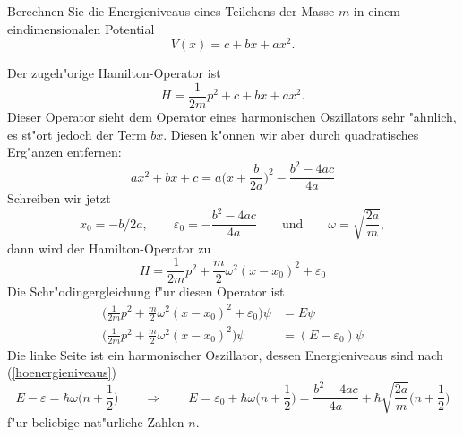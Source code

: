 Berechnen Sie die Energieniveaus eines Teilchens der Masse $m$ in einem
eindimensionalen Potential
\[
V(x)=c+bx+ax^2.
\]

\begin{loesung}
Der zugeh"orige Hamilton-Operator ist
\[
H=\frac1{2m}p^2 + c+bx+ax^2.
\]
Dieser Operator sieht dem Operator eines harmonischen Oszillators sehr
"ahnlich, es st"ort jedoch der Term $bx$.
Diesen k"onnen wir aber durch quadratisches Erg"anzen entfernen:
\[
ax^2+bx+c
=
a\biggl(x+\frac{b}{2a}\biggr)^2-\frac{b^2-4ac}{4a}
\]
Schreiben wir jetzt
\[
x_0=-b/2a,\qquad
\varepsilon_0=-\frac{b^2-4ac}{4a}
\qquad\text{und}\qquad
\omega=\sqrt{\frac{2a}{m}},
\]
dann wird der Hamilton-Operator zu
\[
H=\frac1{2m}p^2 +
\frac{m}{2}\omega^2(x-x_0)^2
+\varepsilon_0
\]
Die Schr"odingergleichung f"ur diesen Operator ist
\begin{align*}
\biggl(
\frac1{2m}p^2 +
\frac{m}{2}\omega^2(x-x_0)^2
+\varepsilon_0
\biggr)\psi&=E\psi
\\
\biggl(
\frac1{2m}p^2 +
\frac{m}{2}\omega^2(x-x_0)^2
\biggr)\psi&=(E-\varepsilon_0)\psi
\end{align*}
Die linke Seite ist ein harmonischer Oszillator, dessen Energieniveaus
sind nach (\ref{hoenergieniveaus})
\[
E-\varepsilon=\hbar\omega\biggl(n+\frac12\biggr)
\qquad\Rightarrow\qquad
E=\varepsilon_0+\hbar\omega\biggl(n+\frac12\biggr)
=\frac{b^2-4ac}{4a}+\hbar\sqrt{\frac{2a}{m}}\biggl(n+\frac12\biggr)
\]
f"ur beliebige nat"urliche Zahlen $n$.
\end{loesung}

